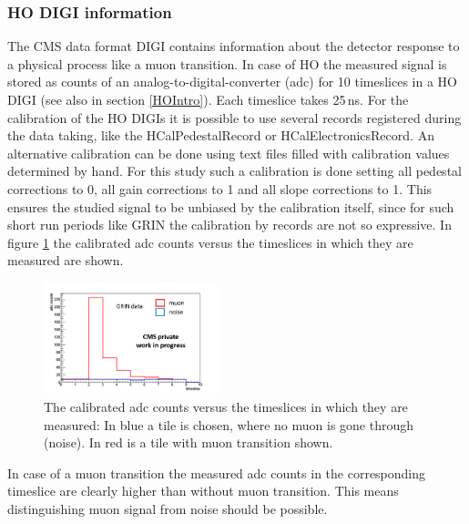 		\subsubsection{HO DIGI information}
			The CMS data format DIGI contains information about the detector response to a physical process like a muon transition.
			In case of HO the measured signal is stored as counts of an analog-to-digital-converter (adc) for 10 timeslices in a HO DIGI (see also in section \ref{HOIntro}).
			Each timeslice takes 25\,ns.
			For the calibration of the HO DIGIs it is possible to use several records registered during the data taking, like the HCalPedestalRecord or HCalElectronicsRecord.
			An alternative calibration can be done using text files filled with calibration values determined by hand.
			For this study such a calibration is done setting all pedestal corrections to 0, all gain corrections to 1 and all slope corrections to 1.
			This ensures the studied signal to be unbiased by the calibration itself, since for such short run periods like GRIN the calibration by records are not so expressive.
			In figure \ref{fig:adc_vs_ts} the calibrated adc counts versus the timeslices in which they are measured are shown.
			\begin{figure}[htbp]
				\centering
				\includegraphics[width=0.45\textwidth]{Figures/erdogan/adc_vs_ts.png}
				\caption{The calibrated adc counts versus the timeslices in which they are measured: In blue a tile is chosen, where no muon is gone through (noise). In red is a tile with muon transition shown.}
				\label{fig:adc_vs_ts}
			\end{figure}
			In case of a muon transition the measured adc counts in the corresponding timeslice are clearly higher than without muon transition.
			This means distinguishing muon signal from noise should be possible.
